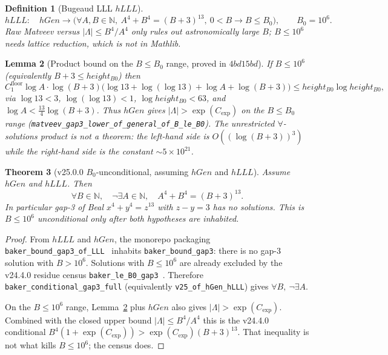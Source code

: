 \documentclass[11pt]{amsart}
\newtheorem{theorem}{Theorem}[section]
\newtheorem{lemma}[theorem]{Lemma}
\newtheorem{definition}[theorem]{Definition}
\begin{document}
\begin{definition}[Bugeaud LLL $hLLL$]
\[
hLLL:\quad
hGen \to
\bigl(\forall A,B\in\mathbb{N},\
A^4+B^4=(B+3)^{13},\ 0<B \to B\le B_0\bigr),
\qquad B_0=10^6.
\]
Raw Matveev versus $|\Lambda|\le B^4/A^4$ only rules out astronomically
large $B$; $B\le 10^6$ needs lattice reduction, which is not in Mathlib.
\end{definition}

\begin{lemma}[Product bound on the $B\le B_0$ range, proved in $4bd15bd$]
\label{lem:product}
If $B\le 10^6$ (equivalently $B+3\le height_{B0}$) then
\[
C_1^{\mathrm{floor}}
\log A\cdot\log(B+3)
\bigl(\log 13+\log(\log 13)+\log A+\log(B+3)\bigr)
\le height_{B0}\log height_{B0},
\]
via $\log 13<3$, $\log(\log 13)<1$, $\log height_{B0}<63$, and
$\log A<\tfrac{13}{4}\log(B+3)$.
Thus $hGen$ gives $|\Lambda|>\exp(C_{\mathrm{exp}})$ on the $B\le B_0$
range (\texttt{matveev\_gap3\_lower\_of\_general\_of\_B\_le\_B0}).
The unrestricted $\forall$-solutions product is not a theorem:
the left-hand side is $O((\log(B+3))^3)$ while the right-hand side is
the constant $\sim 5\times 10^{21}$.
\end{lemma}

\begin{theorem}[v25.0.0 $B_0$-unconditional, assuming $hGen$ and $hLLL$]
\label{thm:v25}
Assume $hGen$ and $hLLL$. Then
\[
\forall B\in\mathbb{N},\quad
\neg\exists A\in\mathbb{N},\quad
A^4+B^4=(B+3)^{13}.
\]
In particular gap-3 of Beal $x^4+y^4=z^{13}$ with $z-y=3$ has no
solutions. This is $B\le 10^6$ unconditional only after both
hypotheses are inhabited.
\end{theorem}

\begin{proof}
From $hLLL$ and $hGen$, the monorepo packaging
\texttt{baker\_bound\_gap3\_of\_LLL}~\cite{beal_level26_v25_0_0}
inhabits \texttt{baker\_bound\_gap3}: there is no gap-3 solution with
$B>10^6$.
Solutions with $B\le 10^6$ are already excluded by the v24.4.0 residue
census \texttt{baker\_le\_B0\_gap3}~\cite{beal_level26_v24_4_0}.
Therefore \texttt{baker\_conditional\_gap3\_full} (equivalently
\texttt{v25\_of\_hGen\_hLLL}) gives $\forall B,\ \neg\exists A$.

On the $B\le 10^6$ range, Lemma~\ref{lem:product} plus $hGen$ also
gives $|\Lambda|>\exp(C_{\mathrm{exp}})$. Combined with the closed
upper bound $|\Lambda|\le B^4/A^4$ this is the v24.4.0 conditional
$B^4(1+\exp(C_{\mathrm{exp}}))>\exp(C_{\mathrm{exp}})(B+3)^{13}$.
That inequality is not what kills $B\le 10^6$; the census does.
\end{proof}
\end{document}
